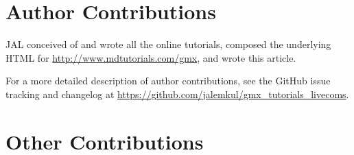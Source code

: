\documentclass[9pt,tutorial]{livecoms}
\newcommand{\githubrepository}{\url{https://github.com/jalemkul/gmx_tutorials_livecoms}}  %
\newcommand{\urlstring}{http://www.mdtutorials.com/gmx}
\newcommand{\tutorialhomeurl}{\url{\urlstring}}
\begin{document}
% 
% 
% 

\section{Author Contributions}
%

JAL conceived of and wrote all the online tutorials, composed the underlying HTML for \tutorialhomeurl, and wrote this article.

For a more detailed description of author contributions,
see the GitHub issue tracking and changelog at \githubrepository.

\section{Other Contributions}
%
\end{document}
